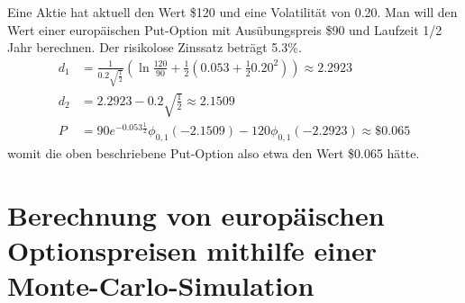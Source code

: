 \documentclass[11pt]{report} %
\begin{document}
\begin{Beispiel}{}{}
    Eine Aktie hat aktuell den Wert \$120 und eine Volatilität von 0.20. Man will den Wert einer europäischen Put-Option mit Ausübungspreis \$90 und Laufzeit 1/2 Jahr berechnen. Der risikolose Zinssatz beträgt 5.3\%.
    \begin{align*}
        d_1&=\frac{1}{0.2\sqrt{\frac{1}{2}}}\left(\ln{\frac{120}{90}}+\frac{1}{2}\left(0.053+\frac{1}{2}0.20^2\right)\right)\approx2.2923\\
        d_2&=2.2923-0.2\sqrt{\frac{1}{2}}\approx2.1509\\
        P&=90e^{-0.053\frac{1}{2}}\phi_{0,1}(-2.1509)-120\phi_{0,1}(-2.2923)\approx \$0.065
    \end{align*}
    womit die oben beschriebene Put-Option also etwa den Wert \$0.065 hätte.
\end{Beispiel}
\section{Berechnung von europäischen Optionspreisen mithilfe einer Monte-Carlo-Simulation}
\end{document}
